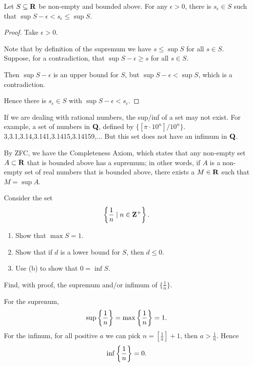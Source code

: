 \begin{proposition}
Let $S \subseteq \mathbf R$ be non-empty and bounded above. For any $\epsilon > 0$, there is $s_\epsilon \in S$ such that $\sup S-\epsilon < s_\epsilon \le \sup S$.
\end{proposition}

\begin{proof}
Take $\epsilon > 0$.

Note that by definition of the supremum we have $s \le \sup S$ for all $s \in S$. Suppose, for a contradiction, that $\sup S-\epsilon \ge s$ for all $s \in S$.

Then $\sup S-\epsilon$ is an upper bound for $S$, but $\sup S-\epsilon < \sup S$, which is a contradiction.

Hence there is $s_\epsilon \in S$ with $\sup S-\epsilon<s_\epsilon$.
\end{proof}

If we are dealing with rational numbers, the sup/inf of a set may not exist. For example, a set of numbers in $\mathbf Q$, defined by $\{[\pi\cdot10^n]/10^n\}$.
3,3.1,3.14,3.141,3.1415,3.14159,...
But this set does not have an infimum in $\mathbf Q$.

By ZFC, we have the Completeness Axiom, which states that any non-empty set $A \subset \mathbf R$ that is bounded above has a supremum; in other words, if $A$ is a non-empty set of real numbers that is bounded above, there exists a $M \in \mathbf R$ such that $M = \sup A$.

\begin{exercise}
Consider the set
\[\left\{\frac{1}{n}\mid n\in\mathbf Z^{+}\right\}.\]
\begin{enumerate}[label=(\alph*)]
\item Show that $\max S=1$.
\item Show that if $d$ is a lower bound for $S$, then $d \le 0$.
\item Use (b) to show that $0 = \inf S$.
\end{enumerate}
\end{exercise}

\begin{exercise}
Find, with proof, the supremum and/or infimum of $\{\frac{1}{n}\}$.
\end{exercise}

\begin{solution}
For the suprenum,
\[ \sup\left\{\frac{1}{n}\right\} = \max\left\{\frac{1}{n}\right\} = 1. \]
For the infinum, for all positive $a$ we can pick $n=[\frac{1}{a}]+1$, then $a>\frac{1}{n}$. Hence 
\[ \inf\left\{\frac{1}{n}\right\}=0. \]
\end{solution}

